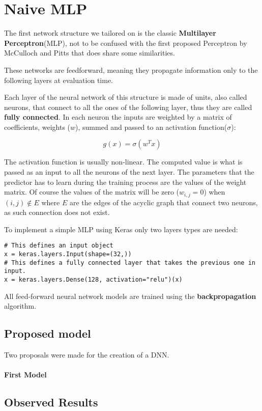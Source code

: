 \newpage
\section{Naive MLP}
\label{sec:naive-mlp}

The first network structure we tailored on is the classic \textbf{Multilayer Perceptron}(MLP), not to be confused with
the first proposed Perceptron by McCulloch and Pitts\cite{mcculloch43a} that does share some similarities.

These networks are feedforward, meaning they propagate information only to the following layers at evaluation time.

Each layer of the neural network of this structure is made of units, also called neurons, that connect
to all the ones of the following layer, thus they are called \textbf{fully connected}.
In each neuron the inputs are weighted by a matrix of coefficients, weights ($w$), summed and passed to an activation function($\sigma$):

\[g(x) = \sigma(w^Tx)\]

The activation function is usually non-linear. The computed value is what is passed as an input to all the neurons of the next layer.
The parameters that the predictor has to learn during the training process are the values of the weight matrix.
Of course the values of the matrix will be zero ($w_{i,j} = 0$) when $(i,j) \notin E$ where $E$ are the edges of the acyclic graph
that connect two neurons, as such connection does not exist.

To implement a simple MLP using Keras only two layers types are needed:
\begin{verbatim}
# This defines an input object
x = keras.layers.Input(shape=(32,))
# This defines a fully connected layer that takes the previous one in input.
x = keras.layers.Dense(128, activation="relu")(x)
\end{verbatim}

All feed-forward neural network models are trained using the \textbf{backpropagation} algorithm\cite{kelley1960gradient}.

\subsection{Proposed model}
Two proposals were made for the creation of a DNN.

\paragraph{First Model}


\subsection{Observed Results}

